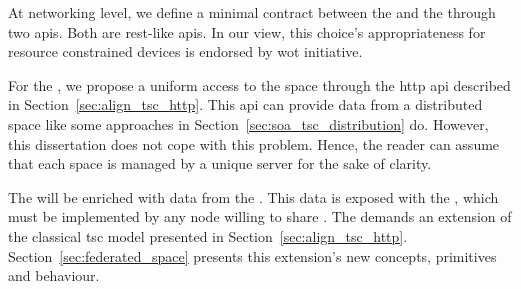 

At networking level, we define a minimal contract between the \asteroids{} and the \coordinators{} through two \acp{api}.
Both are \ac{rest}-like \acp{api}.
In our view, this choice's appropriateness for resource constrained devices is endorsed by \ac{wot} initiative.


For the \coordspace{}, we propose a uniform access to the space through the \acs{http} \ac{api} described in Section~\ref{sec:align_tsc_http}.
This \ac{api} can provide data from a distributed space like some approaches in Section~\ref{sec:soa_tsc_distribution} do.
However, this dissertation does not cope with this problem. %
Hence, the reader can assume that each space is managed by a unique server for the sake of clarity.


The \coordspace{} will be enriched with data from the \outerspace{}. %
This data is exposed with the \osapi{}, which must be implemented by any node willing to share \selfgraphs{}. %
The \outerspace{} demands an extension of the classical \ac{tsc} model presented in Section~\ref{sec:align_tsc_http}.
Section~\ref{sec:federated_space} presents this extension's new concepts, primitives and behaviour.